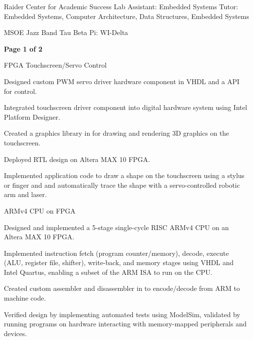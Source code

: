 \documentclass[11pt]{article}
\begin{document}
\sectiontutor
{Raider Center for Academic Success}
{Lab Assistant: Embedded Systems}{}
{Tutor: Embedded Systems, Computer Architecture, Data Structures, Embedded Systems}{}

\vspace{-1.6ex}
\sectionsingle
{MSOE Jazz Band}{}
\vspace{-1.4ex}
\sectionsingle
{Tau Beta Pi: WI-Delta}{}
\vspace{0.5ex}

\vfill
\hfill {\bfseries{Page 1 of 2}}



\sectionproj
{FPGA Touchscreen/Servo Control} 
{\begin{circlist}
	\item Designed custom PWM servo driver hardware component in VHDL and a  API for control.
	\item Integrated touchscreen driver component into digital hardware system using Intel Platform Designer.
	\item Created a graphics library in  for drawing and rendering 3D graphics on the touchscreen.
	\item Deployed RTL design on Altera MAX 10 FPGA. 
	\item Implemented application code to draw a shape on the touchscreen using a stylus or finger and and automatically trace the shape with a servo-controlled robotic arm and laser. 
\end{circlist}}

\sectionproj
{ARMv4 CPU on FPGA} 
{\begin{circlist}
	\item Designed and implemented a 5-stage single-cycle RISC ARMv4 CPU on an Altera MAX 10 FPGA. 
	\item Implemented instruction fetch (program counter/memory), decode, execute (ALU, register file, shifter), write-back, and memory stages using VHDL and Intel Quartus, enabling a subset of the ARM ISA to run on the CPU.
	\item Created custom assembler and disassembler in  to encode/decode from ARM to machine code.
	\item Verified design by implementing automated tests using ModelSim, validated by running programs on hardware interacting with memory-mapped peripherals and devices.
\end{circlist}}
\end{document}
